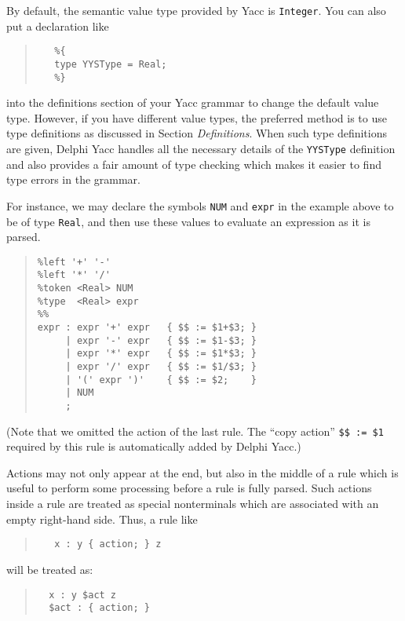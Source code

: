 \documentclass{article}
\begin{document}
By default, the semantic value type provided by Yacc is \verb"Integer". You
can also put a declaration like
\begin{quote}\begin{verbatim}
   %{
   type YYSType = Real;
   %}
\end{verbatim}\end{quote}
into the definitions section of your Yacc grammar to change the default value
type. However, if you have different value types, the preferred method is to
use type definitions as discussed in Section {\em Definitions\/}. When such
type definitions are given, Delphi Yacc handles all the necessary details of the
\verb"YYSType" definition and also provides a fair amount of type checking
which makes it easier to find type errors in the grammar.

For instance, we may declare the symbols \verb"NUM" and \verb"expr" in the
example above to be of type \verb"Real", and then use these values to
evaluate an expression as it is parsed.

\begin{quote}\begin{verbatim}
%left '+' '-'
%left '*' '/'
%token <Real> NUM
%type  <Real> expr
%%
expr : expr '+' expr   { $$ := $1+$3; }
     | expr '-' expr   { $$ := $1-$3; }
     | expr '*' expr   { $$ := $1*$3; }
     | expr '/' expr   { $$ := $1/$3; }
     | '(' expr ')'    { $$ := $2;    }
     | NUM
     ;
\end{verbatim}\end{quote}

(Note that we omitted the action of the last rule. The ``copy action''
\verb"$$ := $1" required by this rule is automatically added by Delphi Yacc.)

Actions may not only appear at the end, but also in the middle of a rule
which is useful to perform some processing before a rule is fully parsed.
Such actions inside a rule are treated as special nonterminals which are
associated with an empty right-hand side. Thus, a rule like
\begin{quote}\begin{verbatim}
   x : y { action; } z
\end{verbatim}\end{quote}
will be treated as:
\begin{quote}\begin{verbatim}
  x : y $act z
  $act : { action; }
\end{verbatim}\end{quote}
\end{document}

